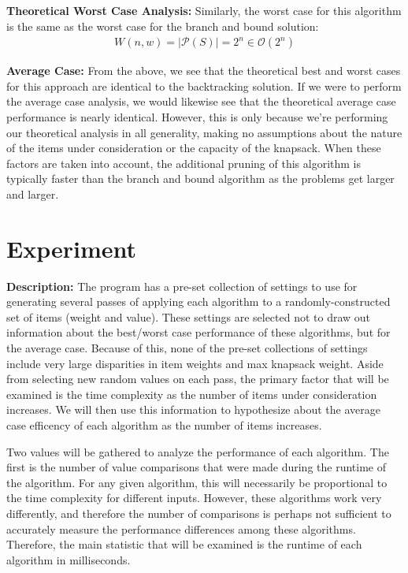 \documentclass{article}
\begin{document}
\textbf{Theoretical Worst Case Analysis:}
Similarly, the worst case for this algorithm is the same as the worst case for the branch and bound solution:
\begin{align}
W(n, w) = |\mathscr{P}(S)| = 2^n \in \mathcal{O}(2^n)
\end{align}

\textbf{Average Case:}
From the above, we see that the theoretical best and worst cases for this approach are identical to the backtracking solution.
If we were to perform the average case analysis, we would likewise see that the theoretical average case performance is nearly identical.
However, this is only because we're performing our theoretical analysis in all generality, making no assumptions about the nature of the items under consideration or the capacity of the knapsack.
When these factors are taken into account, the additional pruning of this algorithm is typically faster than the branch and bound algorithm as the problems get larger and larger.

\pagebreak
\section{Experiment}

\textbf{Description:}
The program has a pre-set collection of settings to use for generating several passes of applying each algorithm to a randomly-constructed set of items (weight and value).
These settings are selected not to draw out information about the best/worst case performance of these algorithms, but for the average case.
Because of this, none of the pre-set collections of settings include very large disparities in item weights and max knapsack weight.
Aside from selecting new random values on each pass, the primary factor that will be examined is the time complexity as the number of items under consideration increases.
We will then use this information to hypothesize about the average case efficency of each algorithm as the number of items increases.

Two values will be gathered to analyze the performance of each algorithm.
The first is the number of value comparisons that were made during the runtime of the algorithm.
For any given algorithm, this will necessarily be proportional to the time complexity for different inputs.
However, these algorithms work very differently, and therefore the number of comparisons is perhaps not sufficient to accurately measure the performance differences among these algorithms.
Therefore, the main statistic that will be examined is the runtime of each algorithm in milliseconds.
\end{document}
